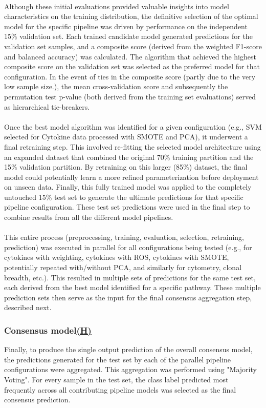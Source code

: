 \documentclass[12pt,a4paper]{report}
\begin{document}
\\
Although these initial evaluations provided valuable insights into model characteristics on the training distribution, the definitive selection of the optimal model for the specific pipeline was driven by performance on the independent 15\% validation set. Each trained candidate model generated predictions for the validation set samples, and a composite score (derived from the weighted F1-score and balanced accuracy) was calculated. The algorithm that achieved the highest composite score on the validation set was selected as the preferred model for that configuration. In the event of ties in the composite score (partly due to the very low sample size.), the mean cross-validation score and subsequently the permutation test p-value (both derived from the training set evaluations) served as hierarchical tie-breakers.\\
\\
Once the best model algorithm was identified for a given configuration (e.g., SVM selected for Cytokine data processed with SMOTE and PCA), it underwent a final retraining step. This involved re-fitting the selected model architecture using an expanded dataset that combined the original 70\% training partition and the 15\% validation partition. By retraining on this larger (85\%) dataset, the final model could potentially learn a more refined parameterization before deployment on unseen data. Finally, this fully trained model was applied to the completely untouched 15\% test set to generate the ultimate predictions for that specific pipeline configuration. These test set predictions were used in the final step to combine results from all the different model pipelines.\\
\\
This entire process (preprocessing, training, evaluation, selection, retraining, prediction) was executed in parallel for all configurations being tested (e.g., for cytokines with weighting, cytokines with ROS, cytokines with SMOTE, potentially repeated with/without PCA, and similarly for cytometry, clonal breadth, etc.). This resulted in multiple sets of predictions for the same test set, each derived from the best model identified for a specific pathway. These multiple prediction sets then serve as the input for the final consensus aggregation step, described next.

\subsubsection*{Consensus model\hyperref[fig:pipeline-1]{(H)}}
Finally, to produce the single output prediction of the overall consensus model, the predictions generated for the test set by each of the parallel pipeline configurations were aggregated. This aggregation was performed using "Majority Voting". For every sample in the test set, the class label predicted most frequently across all contributing pipeline models was selected as the final consensus prediction.
\end{document}
